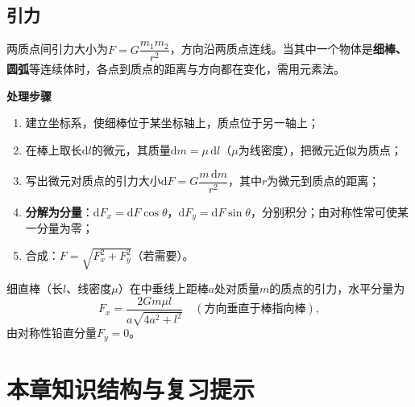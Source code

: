 

\subsection{引力}

两质点间引力大小为$F=G\dfrac{m_1m_2}{r^2}$，方向沿两质点连线。当其中一个物体是\textbf{细棒、圆弧}等连续体时，各点到质点的距离与方向都在变化，需用元素法。

\noindent\textbf{处理步骤}
\begin{enumerate}
  \item 建立坐标系，使细棒位于某坐标轴上，质点位于另一轴上；
  \item 在棒上取长$\mathrm{d}l$的微元，其质量$\mathrm{d}m=\mu\,\mathrm{d}l$（$\mu$为线密度），把微元近似为质点；
  \item 写出微元对质点的引力大小$\mathrm{d}F=G\dfrac{m\,\mathrm{d}m}{r^2}$，其中$r$为微元到质点的距离；
  \item \textbf{分解为分量}：$\mathrm{d}F_x=\mathrm{d}F\cos\theta$，$\mathrm{d}F_y=\mathrm{d}F\sin\theta$，分别积分；由对称性常可使某一分量为零；
  \item 合成：$F=\sqrt{F_x^2+F_y^2}$（若需要）。
\end{enumerate}

\noindent 细直棒（长$l$、线密度$\mu$）在中垂线上距棒$a$处对质量$m$的质点的引力，水平分量为
\[
F_x=\frac{2Gm\mu l}{a\sqrt{4a^2+l^2}}\quad(\text{方向垂直于棒指向棒}),
\]
由对称性铅直分量$F_y=0$。


\section*{本章知识结构与复习提示}

